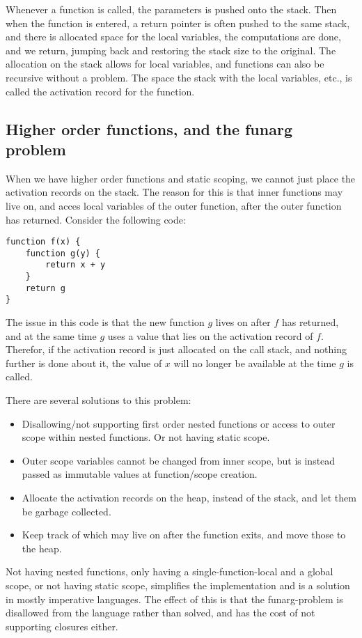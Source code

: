\documentclass[11pt]{report}
\begin{document}
Whenever a function is called, the parameters is pushed onto the stack. Then when the function is entered, a return pointer is often pushed to the same stack, and there is allocated space for the local variables, the computations are done, and we return, jumping back and restoring the stack size to the original.
The allocation on the stack allows for local variables, and functions can also be recursive without a problem. The space the stack with the local variables, etc., is called the activation record for the function.

\subsection{Higher order functions, and the funarg problem}
\label{funarg}

When we have higher order functions and static scoping, we cannot just place the activation records on the stack. The reason for this is that inner functions may live on, and acces local variables of the outer function, after the outer function has returned. Consider the following code:
\begin{verbatim}
function f(x) {
    function g(y) {
        return x + y
    }
    return g
}
\end{verbatim}

The issue in this code is that the new function $g$ lives on after $f$ has returned, and at the same time $g$ uses a value that lies on the activation record of $f$. Therefor, if the activation record is just allocated on the call stack, and nothing further is done about it, the value of $x$ will no longer be available at the time $g$ is called.

There are several solutions to this problem:
\begin{itemize}
\item Disallowing/not supporting first order nested functions or access to outer scope within nested functions. Or not having static scope.
\item Outer scope variables cannot be changed from inner scope, but is instead passed as immutable values at function/scope creation. 
\item Allocate the activation records on the heap, instead of the stack, and let them be garbage collected. 
\item Keep track of which may live on after the function exits, and move those to the heap.
\end{itemize}

Not having nested functions, only having a single-function-local and a global scope, or not having static scope, simplifies the implementation and is a solution in mostly imperative languages.
The effect of this is that the funarg-problem is disallowed from the language rather than solved, and has the cost of not supporting closures either.
\end{document}
